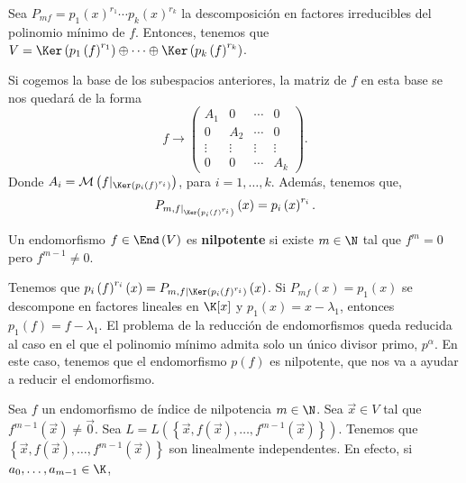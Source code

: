 \begin{fprop}[]
\normalfont Sea $\displaystyle P_{mf} = p_{1}\left(x\right)^{r_{1}}\cdots p_{k}\left(x\right)^{r_{k}} $ la descomposición en factores irreducibles del polinomio mínimo de $\displaystyle f $. Entonces, tenemos que $\displaystyle V = \Ker\left(p_{1}\left(f\right)^{r_{1}}\right) \oplus \cdots \oplus \Ker\left(p_{k}\left(f\right)^{r_{k}}\right) $.
\end{fprop}
\begin{observation}
\normalfont Si cogemos la base de los subespacios anteriores, la matriz de $\displaystyle f $ en esta base se nos quedará de la forma
\[ f \to \begin{pmatrix} A_{1} & 0 & \cdots & 0 \\
0 & A_{2} & \cdots & 0 \\
\vdots & \vdots & \vdots & \vdots \\
0 & 0 & \cdots & A_{k}\end{pmatrix} .\]
Donde $\displaystyle A_{i}  = \mathcal{M}\left(f|_{\Ker\left(p_{i}\left(f\right)^{r_{i}}\right)}\right) $, para $\displaystyle i = 1, \ldots, k $. Además, tenemos que,
\[ P_{m, f|_{\Ker\left(p_{i}\left(f\right)^{r_{i}}\right)}}\left(x\right) = p_{i}\left(x\right)^{r_{i}}.\]
\end{observation}
\begin{fdefinition}[]
\normalfont Un endomorfismo $\displaystyle f \in \End\left(V\right) $ es \textbf{nilpotente} si existe $\displaystyle m \in \N $ tal que $\displaystyle f^{m} = 0 $ pero $\displaystyle f^{m - 1} \neq 0 $.
\end{fdefinition}
\begin{observation}
	\normalfont Tenemos que $\displaystyle p_{i}\left(f\right) ^{r_{i}}\left(x\right) = P_{m,f|\Ker\left(p_{i}\left(f\right)^{r_{i}}\right)}\left(x\right) $. Si $\displaystyle P_{mf}\left(x\right) = p_{1}\left(x\right) $ se descompone en factores lineales en $\displaystyle \K[x] $ y $\displaystyle p_{1}\left(x\right) = x - \lambda_{1} $, entonces $\displaystyle p_{1}\left(f\right) = f - \lambda_{1} $. El problema de la reducción de endomorfismos queda reducida al caso en el que el polinomio mínimo admita solo un único divisor primo, $\displaystyle p^{\alpha } $. En este caso, tenemos que el endomorfismo $\displaystyle p\left(f\right) $ es nilpotente, que nos va a ayudar a reducir el endomorfismo.
\end{observation}
Sea $\displaystyle f $ un endomorfismo de índice de nilpotencia $\displaystyle m \in \N $. Sea $\displaystyle \vec{x} \in V $ tal que $\displaystyle f^{m - 1}\left(\vec{x}\right) \neq \vec{0} $. Sea $\displaystyle L = L\left( \left\{ \vec{x}, f\left(\vec{x}\right), \ldots, f^{m - 1}\left(\vec{x}\right)\right\} \right) $. Tenemos que $\displaystyle \left\{ \vec{x}, f\left(\vec{x}\right), \ldots, f^{m -1}\left(\vec{x}\right)\right\}  $ son linealmente independentes. En efecto, si $\displaystyle a_{0}, \ldots, a_{m - 1} \in \K $,
